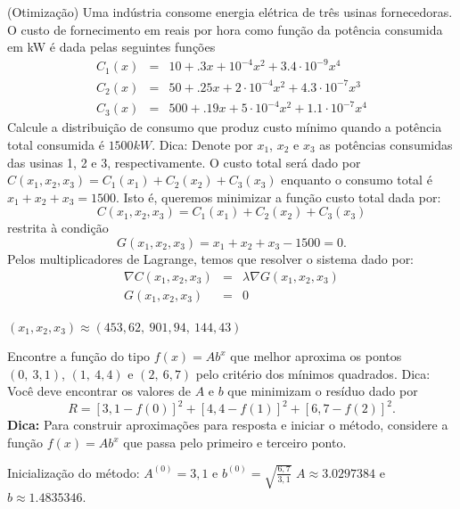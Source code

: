 \begin{exer}(Otimização)\label{nlinsis:usinas} Uma indústria consome energia elétrica de três usinas fornecedoras. O custo de fornecimento em reais por hora como função da potência consumida em kW é dada pelas seguintes funções
\begin{eqnarray*}
C_1(x)&=&10+.3x+10^{-4}x^2+3.4\cdot 10^{-9}x^4\\
C_2(x)&=&50+.25x+2\cdot 10^{-4}x^2+4.3\cdot 10^{-7}x^3\\
C_3(x)&=&500+.19x+5\cdot 10^{-4}x^2+1.1\cdot 10^{-7}x^4
\end{eqnarray*}
Calcule a distribuição de consumo que produz custo mínimo quando a potência total consumida é $1500kW$. Dica: Denote por $x_1$, $x_2$ e $x_3$ as potências consumidas das usinas 1, 2 e 3, respectivamente.  O custo total será dado por $C(x_1,x_2,x_3)=C_1(x_1)+C_2(x_2)+C_3(x_3)$ enquanto o consumo total é $x_1+x_2+x_3=1500$. Isto é, queremos minimizar a função custo total dada por:
$$C(x_1,x_2,x_3)=C_1(x_1)+C_2(x_2)+C_3(x_3)$$
restrita à condição
$$G(x_1,x_2,x_3)=x_1+x_2+x_3-1500=0.$$
Pelos multiplicadores de Lagrange, temos que resolver o sistema dado por:
\begin{eqnarray*}
\nabla C(x_1,x_2,x_3) &=& \lambda \nabla G(x_1,x_2,x_3)\\
G(x_1,x_2,x_3)&=&0
\end{eqnarray*}
\end{exer}
\begin{resp}
 $(x_1,x_2,x_3)\approx (453,62,~ 901,94,~ 144,43)$
\end{resp}


\begin{exer} \label{nlinsis:prob_ajuste_eax} Encontre a função do tipo $f(x)=Ab^{x}$ que melhor aproxima os pontos $(0,~3,1)$, $(1,~4,4)$ e $(2,~6,7)$ pelo critério dos mínimos quadrados. Dica: Você deve encontrar os valores de $A$ e $b$ que minimizam o resíduo dado por
$$R=\left[3,1-f(0)\right]^2+\left[4,4-f(1)\right]^2+\left[6,7-f(2)\right]^2.$$
{\bf Dica:} Para construir aproximações para resposta e iniciar o método, considere a função $f(x)=Ab^x$ que passa pelo primeiro e terceiro ponto.
\end{exer}
\begin{resp}
Inicialização do método: $A^{(0)}= 3,1$ e $b^{(0)}= \sqrt{\frac{6,7}{3,1}}$
$A\approx  3.0297384 $ e $b\approx 1.4835346$.
\end{resp}


